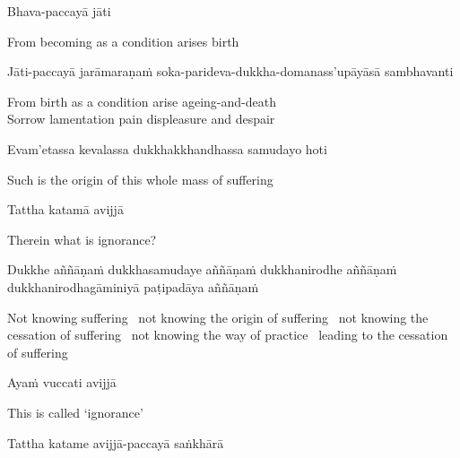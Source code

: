 Bhava-paccayā jāti

\begin{english}
  From becoming as a condition arises birth
\end{english}

\begin{pali-hang}
  Jāti-paccayā jarāmaraṇaṁ soka-parideva-dukkha-domanass'upāyāsā sambhavanti
\end{pali-hang}

\begin{english}
  From birth as a condition arise ageing-and-death\\
  Sorrow lamentation pain displeasure and despair
\end{english}

Evam'etassa kevalassa dukkhakkhandhassa samudayo hoti

\begin{english}
  Such is the origin of this whole mass of suffering
\end{english}

Tattha katamā avijjā

\begin{english}
  Therein what is ignorance?
\end{english}

\begin{pali-hang}
  Dukkhe aññāṇaṁ dukkhasamudaye aññāṇaṁ dukkhanirodhe aññāṇaṁ dukkhanirodhagāminiyā paṭipadāya aññāṇaṁ
\end{pali-hang}

\begin{english-hang-verses}
  Not knowing suffering \breathmark\ not knowing the origin of suffering \breathmark\ not knowing the cessation of suffering \breathmark\ not knowing the way of practice \breathmark\ leading to the cessation of suffering
\end{english-hang-verses}

Ayaṁ vuccati avijjā

\begin{english}
  This is called `ignorance'
\end{english}

\begin{pali-hang}
  Tattha katame avijjā-paccayā saṅkhārā
\end{pali-hang}

